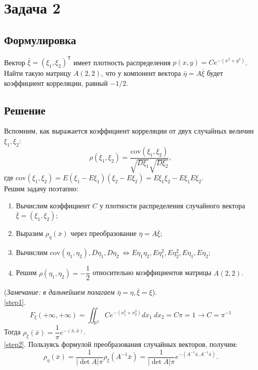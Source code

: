 \documentclass[specialist,
substylefile = spbu_report.rtx,
subf,href,colorlinks=true, 12pt]{disser}
\newcommand{\R}{\mathbb{R}}
\begin{document}
	\section{Задача 2}
	\subsection{Формулировка}
	Вектор $\bar{\xi}=(\xi_1,\xi_2)^\mathsf{T}$ имеет плотность распределения $p(x,y)=Ce^{-(x^2+y^2)}$. Найти такую матрицу $A(2,2)$, что у компонент вектора $\bar{\eta} = A\bar{\xi}$ будет коэффициент корреляции, равный $-1/2.$
	\subsection{Решение}
	Вспомним, как выражается коэффициент корреляции от двух случайных величин $\xi_1, \xi_2$:
	\begin{equation*}
		\rho(\xi_1,\xi_2)=\dfrac{\mathrm{cov}(\xi_1,\xi_2)}{\sqrt{D\xi_1}\sqrt{D\xi_2}},
	\end{equation*}
	где $\mathrm{cov}(\xi_1, \xi_2) = E(\xi_1 - E\xi_1)(\xi_2 - E\xi_2) = E\xi_1\xi_2 - E\xi_1E\xi_2$.\\
	Решим задачу поэтапно:
	\begin{enumerate}
		\item Вычислим коэффициент $C$ у плотности распределения случайного вектора $\bar{\xi} = (\xi_1, \xi_2)$;\label{step1}
		\item Выразим $\rho_{\bar{\eta}}(\bar{x})$ через преобразование $\bar{\eta} = A\bar{\xi}$;\label{step2}
		\item Вычислим $\mathrm{cov}(\eta_1,\eta_2), D\eta_1, D\eta_2~\Leftrightarrow E\eta_1\eta_2, E\eta_1^2, E\eta_2^2, E\eta_1, E\eta_2$;\label{step3}
		\item Решим $\rho(\eta_1, \eta_2) = -\dfrac{1}{2}$ относительно коэффициентов матрицы $A(2,2)$.\label{step4}
	\end{enumerate}
	(\textit{Замечание: в дальнейшем полагаем $\bar{\eta}=\eta, \bar{\xi}=\xi$}).\\
	\ref{step1}.
	\begin{equation*}
		F_\xi(+\infty, +\infty) = \iint_{\R^2}Ce^{-(x_1^2 + x_2^2)}dx_1~dx_2=C\pi=1\rightarrow C = \pi^{-1}
	\end{equation*}
	Тогда $\rho_\xi(\bar{x})=\dfrac{1}{\pi}e^{-(\bar{x}, \bar{x})}$.
	\\\ref{step2}. Пользуясь формулой преобразования случайных векторов, получим:
	\begin{equation*}
		\rho_\eta(\bar{x})=\dfrac{1}{|\det A|\pi}\rho_\xi(A^{-1}\bar{x}) = \dfrac{1}{|\det A|\pi}e^{-(A^{-1}\bar{x}, A^{-1}\bar{x})}.
	\end{equation*}
\end{document}
